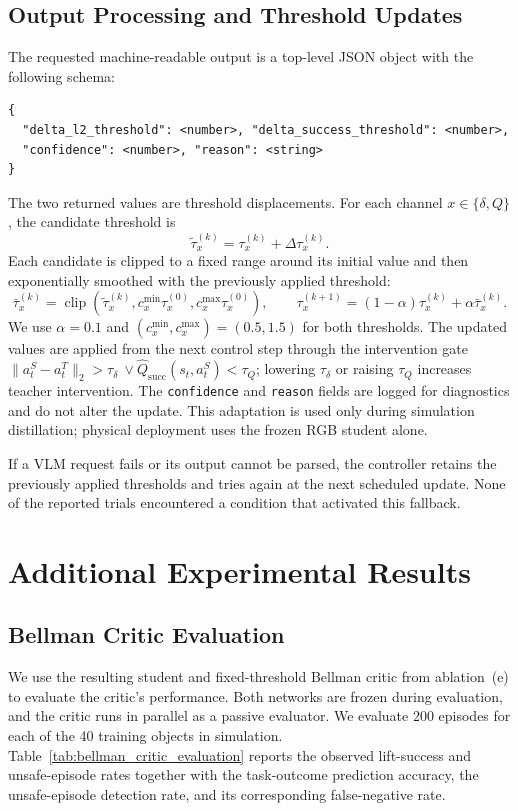 \begin{samepage}
\subsection{Output Processing and Threshold Updates}
The requested machine-readable output is a top-level JSON object with the
following schema:
\begin{verbatim}
{
  "delta_l2_threshold": <number>, "delta_success_threshold": <number>,
  "confidence": <number>, "reason": <string>
}
\end{verbatim}
\end{samepage}
The two returned values are threshold displacements. For each channel
$x\in\{\delta,Q\}$, the candidate threshold is
\[
\tilde\tau_x^{(k)}=\tau_x^{(k)}+\Delta\tau_x^{(k)}.
\]
Each candidate is clipped to a fixed range around its initial value and then
exponentially smoothed with the previously applied threshold:
\[
\bar\tau_x^{(k)}=\operatorname{clip}\!\left(
\tilde\tau_x^{(k)},c_x^{\min}\tau_x^{(0)},
c_x^{\max}\tau_x^{(0)}\right),\qquad
\tau_x^{(k+1)}=(1-\alpha)\tau_x^{(k)}+\alpha\bar\tau_x^{(k)}.
\]
We use $\alpha=0.1$ and $(c_x^{\min},c_x^{\max})=(0.5,1.5)$ for both
thresholds. The updated values are applied from the next control step through
the intervention gate
$\lVert a_t^S-a_t^T\rVert_2>\tau_\delta\ \lor
\hat Q_{\mathrm{succ}}(s_t,a_t^S)<\tau_Q$; lowering $\tau_\delta$ or raising
$\tau_Q$ increases teacher intervention. The \texttt{confidence} and
\texttt{reason} fields are logged for diagnostics and do not alter the update.
This adaptation is used only during simulation distillation; physical
deployment uses the frozen RGB student alone.

If a VLM request fails or its output cannot be parsed, the controller retains
the previously applied thresholds and tries again at the next scheduled update.
None of the reported trials encountered a condition that activated this
fallback.

\section{Additional Experimental Results}
\label{app:additional_experimental_results}

\subsection{Bellman Critic Evaluation}
We use the resulting student and fixed-threshold Bellman critic from
ablation~(e) to evaluate the critic's performance. Both networks are frozen
during evaluation, and the critic runs in parallel as a passive evaluator. We
evaluate 200 episodes for each of the 40 training objects in simulation.
Table~\ref{tab:bellman_critic_evaluation} reports the observed lift-success and
unsafe-episode rates together with the task-outcome prediction accuracy, the
unsafe-episode detection rate, and its corresponding false-negative rate.

